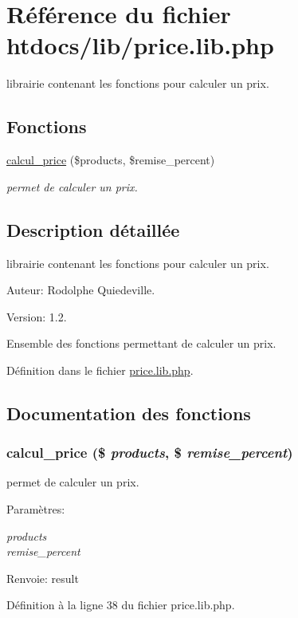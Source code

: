 \hypertarget{price_8lib_8php}{
\section{R\'{e}f\'{e}rence du fichier htdocs/lib/price.lib.php}
\label{price_8lib_8php}
}
librairie contenant les fonctions pour calculer un prix.  


\subsection*{Fonctions}
\begin{CompactItemize}
\item 
\hyperlink{price_8lib_8php_a0}{calcul\_\-price} (\$products, \$remise\_\-percent)
\begin{CompactList}\small\item\em permet de calculer un prix. \item\end{CompactList}\end{CompactItemize}


\subsection{Description d\'{e}taill\'{e}e}
librairie contenant les fonctions pour calculer un prix. 

\begin{Desc}
\item[Auteur:]Rodolphe Quiedeville. \end{Desc}
\begin{Desc}
\item[Version:]1.2.\end{Desc}
Ensemble des fonctions permettant de calculer un prix.

D\'{e}finition dans le fichier \hyperlink{price_8lib_8php-source}{price.lib.php}.

\subsection{Documentation des fonctions}
\hypertarget{price_8lib_8php_a0}{
\subsubsection[calcul\_\-price]{\setlength{\rightskip}{0pt plus 5cm}calcul\_\-price (\$ {\em products}, \$ {\em remise\_\-percent})}}
\label{price_8lib_8php_a0}


permet de calculer un prix. 

\begin{Desc}
\item[Param\`{e}tres:]
\begin{description}
\item[{\em products}]\item[{\em remise\_\-percent}]\end{description}
\end{Desc}
\begin{Desc}
\item[Renvoie:]result \end{Desc}


D\'{e}finition \`{a} la ligne 38 du fichier price.lib.php.